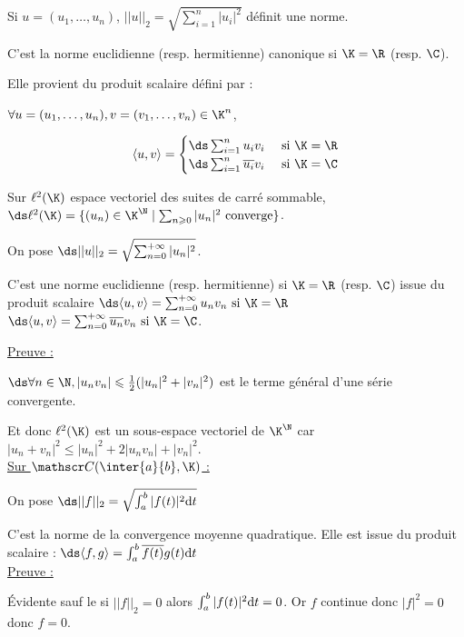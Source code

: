 \begin{exemple}
    Si $u = (u_1, \dots, u_n)$, $\displaystyle ||u||_2 = \sqrt{\sum_{i = 1}^{n} |u_i|^2}$
    définit une norme. 

    C'est la norme euclidienne (resp. hermitienne) canonique si $\K = \R$ (resp. $\C$). 

    Elle provient du produit scalaire défini par : 

    $\forall u = (u_1, \dots, u_n), v = (v_1, \dots, v_n) \in \K^n$,

    \[
    \langle u, v \rangle = \begin{cases}
        \ds \sum_{i = 1}^{n} u_i v_i & ~ \text{si} ~ \K = \R \\
        \ds \sum_{i = 1}^{n} \overline{u_i} v_i & ~ \text{si} ~ \K = \C \\
    \end{cases}
    \]

    Sur $\ell^2(\K)$ espace vectoriel des suites de carré sommable,
    $\ds \ell^2(\K) = \{(u_n) \in \K^{\N} \mid \sum_{n \geqslant 0} |u_n|^2 \text{ converge}\}$.
    
    On pose $\ds ||u||_2 = \sqrt{\sum_{n = 0 }^{+ \infty} |u_n|^2}$.

    C'est une norme euclidienne (resp. hermitienne) si $\K = \R$ (resp. $\C$) issue
    du produit scalaire $\ds \langle u, v \rangle = \sum_{n = 0}^{+\infty} u_n v_n ~ \text{si} ~ \K = \R$
    $\ds \langle u, v \rangle = \sum_{n = 0}^{+\infty} \overline{u_n} v_n ~ \text{si} ~ \K = \C$.

    \uline{Preuve :}

    \svspace $\ds \forall n \in \N, |u_n v_n| \leqslant \frac 1 2 (|u_n|^2 + |v_n|^2)$ est le terme
    général d'une série convergente. 

    Et donc $\ell^2(\K)$ est un sous-espace vectoriel de $\K^{\N}$ car $|u_n + v_n|^2 \leqslant |u_n|^2 + 2 |u_n v_n| + |v_n|^2$. \\

    \uline{Sur $\mathscr C(\inter{a}{b}, \K)$ :}

    \avspace On pose $\ds ||f||_2 = \sqrt{\int_{a}^{b} |f(t)|^2 \text d t}$

    C'est la norme de la convergence moyenne quadratique. Elle est issue du produit scalaire :
    $\ds \langle f, g \rangle = \int_{a}^{b} \overline{f(t)} g(t) \text d t$ \\

    \uline{Preuve :}

    Évidente sauf le si $||f||_2 = 0$ alors $\int_{a }^{b } |f(t)|^2 \text d t = 0$. Or $f$ continue donc $|f|^2 = 0 $ donc $f = 0$.
\end{exemple}


